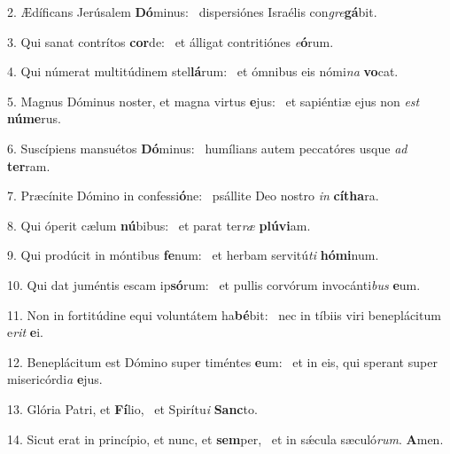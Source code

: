 2. Ædíficans Jerúsalem \textbf{Dó}minus: \ast\  dispersiónes Israélis con\textit{gre}\textbf{gá}bit.\

3. Qui sanat contrítos \textbf{cor}de: \ast\  et álligat contritiónes \textit{e}\textbf{ó}rum.\

4. Qui númerat multitúdinem stel\textbf{lá}rum: \ast\  et ómnibus eis nómi\textit{na} \textbf{vo}cat.\

5. Magnus Dóminus noster, et magna virtus \textbf{e}jus: \ast\  et sapiéntiæ ejus non \textit{est} \textbf{nú}\textbf{me}rus.\

6. Suscípiens mansuétos \textbf{Dó}minus: \ast\  humílians autem peccatóres usque \textit{ad} \textbf{ter}ram.\

7. Præcínite Dómino in confessi\textbf{ó}ne: \ast\  psállite Deo nostro \textit{in} \textbf{cí}\textbf{tha}ra.\

8. Qui óperit cælum \textbf{nú}bibus: \ast\  et parat ter\textit{ræ} \textbf{plú}\textbf{vi}am.\

9. Qui prodúcit in móntibus \textbf{fe}num: \ast\  et herbam servitú\textit{ti} \textbf{hó}\textbf{mi}num.\

10. Qui dat juméntis escam ip\textbf{só}rum: \ast\  et pullis corvórum invocánti\textit{bus} \textbf{e}um.\

11. Non in fortitúdine equi voluntátem ha\textbf{bé}bit: \ast\  nec in tíbiis viri beneplácitum e\textit{rit} \textbf{e}i.\

12. Beneplácitum est Dómino super timéntes \textbf{e}um: \ast\  et in eis, qui sperant super misericórdi\textit{a} \textbf{e}jus.\

13. Glória Patri, et \textbf{Fí}lio, \ast\  et Spirítu\textit{i} \textbf{Sanc}to.\

14. Sicut erat in princípio, et nunc, et \textbf{sem}per, \ast\  et in sǽcula sæculó\textit{rum}. \textbf{A}men.\

